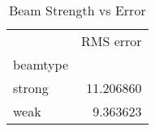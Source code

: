 \begin{table}
\caption{Beam Strength vs Error}
\begin{tabular}{lr}
 & RMS error \\
beamtype &  \\
strong & 11.206860 \\
weak & 9.363623 \\
\end{tabular}
\end{table}
